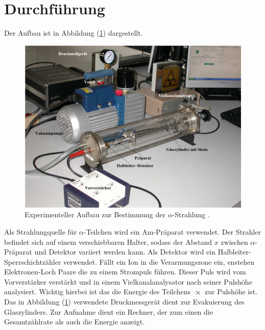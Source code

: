 \section{Durchführung}
Der Aufbau ist in Abbildung (\ref{abb:1}) dargestellt.
\begin{figure}[H]
  \centering
  \includegraphics[width=\textwidth]{content/Aufbau.png}
  \caption{Experimenteller Aufbau zur Bestimmung der $\alpha$-Strahlung \cite{1}.}
  \label{abb:1}
\end{figure}
Als Strahlungquelle für $\alpha$-Teilchen wird ein Am-Präparat verwendet.
Der Strahler befindet sich auf einem verschiebbaren Halter, sodass der Abstand $x$
zwischen $\alpha$-Präparat und Detektor variiert werden kann. Als Detektor
wird ein Halbleiter-Sperrschichtzähler verwendet. Fällt ein Ion in die Verarmungszone
ein, enstehen Elektronen-Loch Paare die zu einem Strompuls führen. Dieser Puls wird
vom Vorverstärker verstärkt und in einem Vielkanalanalysator nach seiner Pulshöhe analysiert. Wichtig hierbei
ist das die Energie des Teilchens $\propto $ zur Pulshöhe ist.
Das in Abbildung (\ref{abb:1}) verwendete Druckmessgerät dient zur Evakuierung des Glaszylinders.
Zur Aufnahme dient ein Rechner, der zum einen die Gesamtzählrate als auch die Energie anzeigt.
